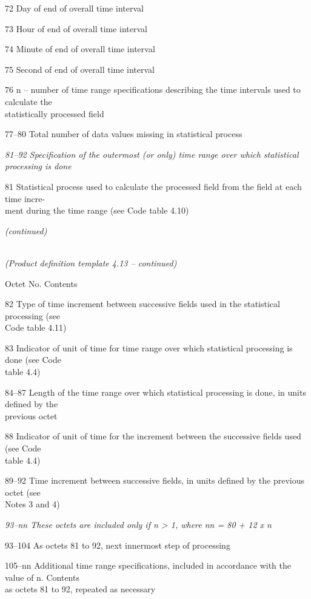 72 Day of end of overall time interval

73 Hour of end of overall time interval

74 Minute of end of overall time interval

75 Second of end of overall time interval

76 n -- number of time range specifications describing the time intervals used to calculate the\\
statistically processed field

77--80 Total number of data values missing in statistical process

\emph{81--92 Specification of the outermost (or only) time range over which statistical}\\
\emph{processing is done}

81 Statistical process used to calculate the processed field from the field at each time incre-\\
ment during the time range (see Code table 4.10)

\emph{(continued)}

\emph{\\
(Product definition template 4.13 -- continued)}

Octet No. Contents

82 Type of time increment between successive fields used in the statistical processing (see\\
Code table 4.11)

83 Indicator of unit of time for time range over which statistical processing is done (see Code\\
table 4.4)

84--87 Length of the time range over which statistical processing is done, in units defined by the\\
previous octet

88 Indicator of unit of time for the increment between the successive fields used (see Code\\
table 4.4)

89--92 Time increment between successive fields, in units defined by the previous octet (see\\
Notes 3 and 4)

\emph{93--nn These octets are included only if n \textgreater{} 1, where nn = 80 + 12 x n}

93--104 As octets 81 to 92, next innermost step of processing

105--nn Additional time range specifications, included in accordance with the value of n. Contents\\
as octets 81 to 92, repeated as necessary

